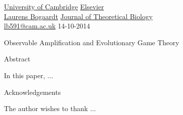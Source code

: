 \documentclass[a4paper,12pt]{article}
\numberwithin{equation}{section}
\begin{document}
\label{sec:Cover Page}

\href{http://www.cam.ac.uk}{University of Cambridge} \hfill \href{http://www.journals.elsevier.com}{Elsevier}\\
\href{http://www.bogaardtresearch.tk}{Laurens Bogaardt} \hfill \href{http://www.journals.elsevier.com/journal-of-theoretical-biology}{Journal of Theoretical Biology}\\
\href{mailto:lb591@cam.ac.uk}{lb591@cam.ac.uk} \hfill 14-10-2014\\

\vspace{5cm}

\begin{center}
\begin{LARGE}
\begin{bf}
Observable Amplification and Evolutionary Game Theory
\end{bf}
\end{LARGE}
\end{center}

\vfill

\begin{center}
\begin{minipage}[t]{0.72\textwidth}
\begin{bf}
Abstract
\end{bf}
\vspace{.2cm}
\newline
In this paper, ...
\end{minipage}
\end{center}

\vspace{.6cm}

\begin{center}
\begin{minipage}[t]{0.72\textwidth}
\begin{bf}
Acknowledgements
\end{bf}
\vspace{.2cm}
\newline
The author wishes to thank ...
\end{minipage}
\end{center}

\vspace{.6cm}

\newpage


\label{sec:Contents}
\renewcommand{\contentsname}{Contents\\} 
\end{document}
